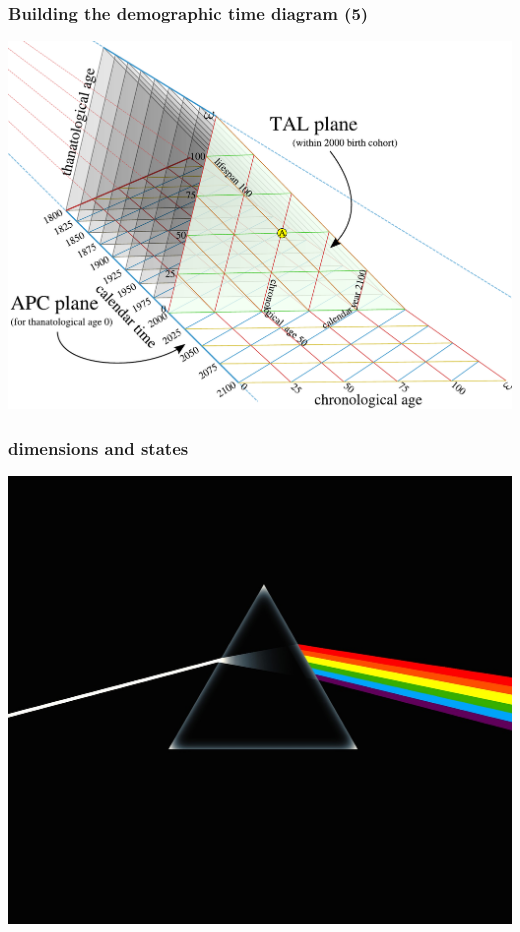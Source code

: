 \documentclass[20pt]{beamer}
\begin{document}
\begin{frame}
\frametitle{Building the demographic time diagram (5)}
\vspace{-1em}
\begin{center}
\includegraphics[scale=.8]{Figures/buildTAL5.pdf}
\end{center}
\end{frame}




\begin{frame}
\frametitle{dimensions and states}
\vspace{-10em}
\begin{center}
\hspace*{-6cm}\includegraphics[scale=.7]{Figures/prism.jpg}
\end{center}
\end{frame}
\end{document}
